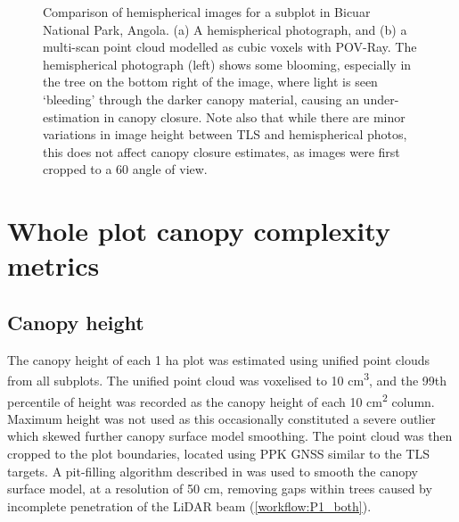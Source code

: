 \begin{refsection}
\begin{figure}
\begin{subfigure}{0.45\linewidth}
		\caption{}
		\label{workflow:hemi_tls}
	\end{subfigure}
	\caption[Comparison of hemispherical images generated from TLS and hemispherical photography]{Comparison of hemispherical images for a subplot in Bicuar National Park, Angola. (a) A hemispherical photograph, and (b) a multi-scan point cloud modelled as cubic voxels with POV-Ray. The hemispherical photograph (left) shows some blooming, especially in the tree on the bottom right of the image, where light is seen `bleeding' through the darker canopy material, causing an under-estimation in canopy closure. Note also that while there are minor variations in image height between TLS and hemispherical photos, this does not affect canopy closure estimates, as images were first cropped to a 60\textdegree{} angle of view.}
	\label{workflow:hemi_tls_ex}
\end{figure}

\section{Whole plot canopy complexity metrics}
\label{workflow:sec:plot_metrics}

\subsection{Canopy height}
\label{workflow:ssec:height}

The canopy height of each 1 ha plot was estimated using unified point clouds from all subplots. The unified point cloud was voxelised to 10 cm\textsuperscript{3}, and the 99th percentile of height was recorded as the canopy height of each 10 cm\textsuperscript{2} column. Maximum height was not used as this occasionally constituted a severe outlier which skewed further canopy surface model smoothing. The point cloud was then cropped to the plot boundaries, located using PPK GNSS similar to the TLS targets. A pit-filling algorithm described in \citet{Khosravipour2014} was used to smooth the canopy surface model, at a resolution of 50 cm, removing gaps within trees caused by incomplete penetration of the LiDAR beam (\autoref{workflow:P1_both}). 


\end{refsection}
